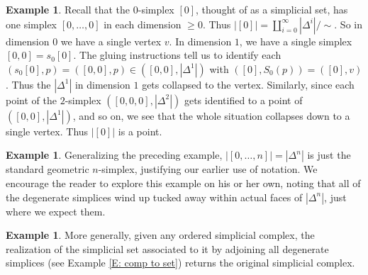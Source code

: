 \documentclass[12pt]{article}
\theoremstyle{plain}
\theoremstyle{definition}
\newtheorem{example}[theorem]{Example}
\begin{document}
\begin{example}\label{E: 0}
Recall that the $0$-simplex $[0]$, thought of as a simplicial set, has one simplex $[0,\ldots,0]$ in each dimension $\geq 0$. Thus $|[0]|=\coprod_{i=0}^\infty |\Delta^i|/\sim$. So in dimension $0$ we have a single vertex $v$. In dimension $1$, we have a single simplex $[0,0]=s_0[0]$. The gluing instructions tell us to identify each $(s_0[0],p)=([0,0],p)\in ([0,0],|\Delta^1|)$
with $([0],S_0(p))=([0],v)$. Thus the $|\Delta^1|$ in dimension $1$ gets collapsed to the vertex. Similarly, since each point of the $2$-simplex $([0,0,0],|\Delta^2|)$ gets identified to a point of $([0,0],|\Delta^1|)$, and so on, we see that the whole situation collapses down to a single vertex. Thus $|[0]|$ is a point.
\end{example}

\begin{example}
Generalizing the preceding example, $|[0,\ldots, n]|=|\Delta^n|$ is just the standard geometric $n$-simplex, justifying our earlier use of notation.  We encourage the reader to explore this example on his or her own, noting that all of the degenerate simplices wind up tucked away within actual faces of $|\Delta^n|$, just where we expect them.
\end{example}

\begin{example}\label{E: return}
More generally, given any ordered simplicial complex, the realization of the simplicial set associated to it by adjoining all degenerate simplices (see Example \ref{E: comp to set}) returns the original simplicial complex.
\end{example}
\end{document}
